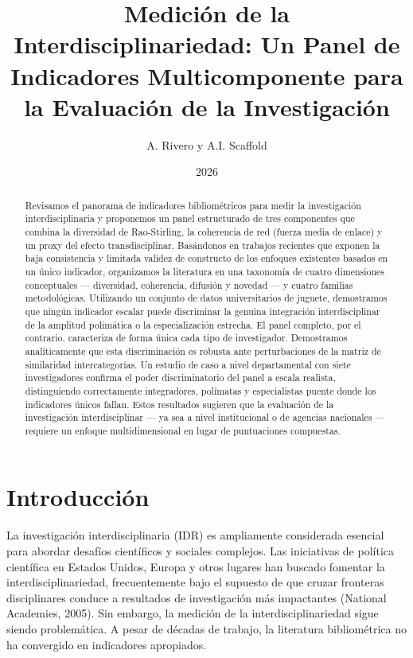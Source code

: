 \documentclass[
]{article}
\title{Medición de la Interdisciplinariedad: Un Panel de Indicadores
Multicomponente para la Evaluación de la Investigación}
\author{A. Rivero y A.I. Scaffold}
\date{2026}
\begin{document}
\maketitle
\begin{abstract}
Revisamos el panorama de indicadores bibliométricos para medir la
investigación interdisciplinaria y proponemos un panel estructurado de
tres componentes que combina la diversidad de Rao-Stirling, la
coherencia de red (fuerza media de enlace) y un proxy del efecto
transdisciplinar. Basándonos en trabajos recientes que exponen la baja
consistencia y limitada validez de constructo de los enfoques existentes
basados en un único indicador, organizamos la literatura en una
taxonomía de cuatro dimensiones conceptuales --- diversidad, coherencia,
difusión y novedad --- y cuatro familias metodológicas. Utilizando un
conjunto de datos universitarios de juguete, demostramos que ningún
indicador escalar puede discriminar la genuina integración
interdisciplinar de la amplitud polimática o la especialización
estrecha. El panel completo, por el contrario, caracteriza de forma
única cada tipo de investigador. Demostramos analíticamente que esta
discriminación es robusta ante perturbaciones de la matriz de
similaridad intercategorías. Un estudio de caso a nivel departamental
con siete investigadores confirma el poder discriminatorio del panel a
escala realista, distinguiendo correctamente integradores, polímatas y
especialistas puente donde los indicadores únicos fallan. Estos
resultados sugieren que la evaluación de la investigación
interdisciplinar --- ya sea a nivel institucional o de agencias
nacionales --- requiere un enfoque multidimensional en lugar de
puntuaciones compuestas.
\end{abstract}

\hypertarget{introducciuxf3n}{%
\section{Introducción}\label{introducciuxf3n}}

La investigación interdisciplinaria (IDR) es ampliamente considerada
esencial para abordar desafíos científicos y sociales complejos. Las
iniciativas de política científica en Estados Unidos, Europa y otros
lugares han buscado fomentar la interdisciplinariedad, frecuentemente
bajo el supuesto de que cruzar fronteras disciplinares conduce a
resultados de investigación más impactantes (National Academies, 2005).
Sin embargo, la medición de la interdisciplinariedad sigue siendo
problemática. A pesar de décadas de trabajo, la literatura bibliométrica
no ha convergido en indicadores apropiados.
\end{document}
